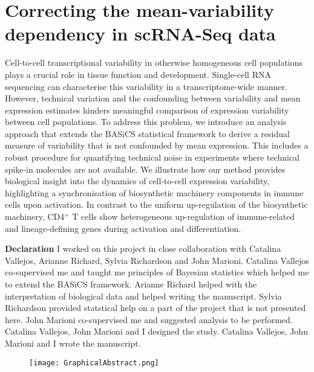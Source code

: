 
\chapter{Correcting the mean-variability dependency in scRNA-Seq data}  

\graphicspath{{Chapter2/Figures/}}

\begin{Abstract}
Cell-to-cell transcriptional variability in otherwise homogeneous cell populations plays a crucial role in tissue function and development. Single-cell RNA sequencing can characterise this variability in a transcriptome-wide manner. However, technical variation and the confounding between variability and mean expression estimates hinders meaningful comparison of expression variability between cell populations. To address this problem, we introduce an analysis approach that extends the BASiCS statistical framework to derive a residual measure of variability that is not confounded by mean expression. This includes a robust procedure for quantifying technical noise in experiments where technical spike-in molecules are not available.
We illustrate how our method provides biological insight into the dynamics of cell-to-cell expression variability, highlighting a synchronisation of biosynthetic machinery components in immune cells upon activation. In contrast to the uniform up-regulation of the biosynthetic machinery, CD4$^+$ T cells show heterogeneous up-regulation of immune-related and lineage-defining genes during activation and differentiation. 
\end{Abstract}

\newpage

\begin{Comment}
\textbf{Declaration} I worked on this project in close collaboration with Catalina Vallejos, Arianne Richard, Sylvia Richardson and John Marioni. Catalina Vallejos co-supervised me and taught me principles of Bayesian statistics which helped me to extend the BASiCS framework. Arianne Richard helped with the interpretation of biological data and helped writing the manuscript. Sylvia Richardson provided statstical help on a part of the project that is not presented here. John Marioni co-supervised me and suggested analysis to be performed. Catalina Vallejos, John Marioni and I designed the study. Catalina Vallejos, John Marioni and I wrote the manuscript.
\end{Comment}

\begin{figure}[hb]
\centering    
\texttt{[image: GraphicalAbstract.png]}
\caption*{}
\end{figure}


\newpage


\newpage


